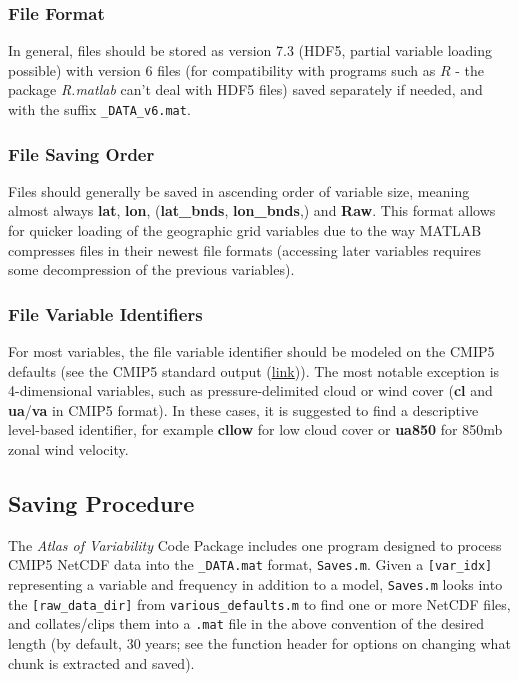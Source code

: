 \documentclass{article}
\begin{document}
\subsubsection{File Format}
In general, files should be stored as version 7.3 (HDF5, partial variable loading possible) with version 6 files (for compatibility with programs such as $R$ - the package \textit{R.matlab} can't deal with HDF5 files) saved separately if needed, and with the suffix \texttt{\_DATA\_v6.mat}. 

\subsubsection{File Saving Order}
Files should generally be saved in ascending order of variable size, meaning almost always \textbf{lat}, \textbf{lon}, (\textbf{lat\_bnds}, \textbf{lon\_bnds},) and \textbf{Raw}. This format allows for quicker loading of the geographic grid variables due to the way MATLAB compresses files in their newest file formats (accessing later variables requires some decompression of the previous variables).

\subsubsection{File Variable Identifiers}
For most variables, the file variable identifier should be modeled on the CMIP5 defaults (see the CMIP5 standard output (\href{cmip-pcmdi.llnl.gov/cmip5/docs/standard_output.pdf}{\underline{link}})). The most notable exception is 4-dimensional variables, such as pressure-delimited cloud or wind cover (\textbf{cl} and \textbf{ua}/\textbf{va} in CMIP5 format). In these cases, it is suggested to find a descriptive level-based identifier, for example \textbf{cllow} for low cloud cover or \textbf{ua850} for 850mb zonal wind velocity. 

\subsection{Saving Procedure} 
The \textit{Atlas of Variability} Code Package includes one program designed to process CMIP5 NetCDF data into the \texttt{\_DATA.mat} format, \texttt{Saves.m}. Given a \texttt{[var\_idx]} representing a variable and frequency in addition to a model, \texttt{Saves.m} looks into the \texttt{[raw\_data\_dir]} from \texttt{various\_defaults.m} to find one or more NetCDF files, and collates/clips them into a \texttt{.mat} file in the above convention of the desired length (by default, 30 years; see the function header for options on changing what chunk is extracted and saved). 
\end{document}
